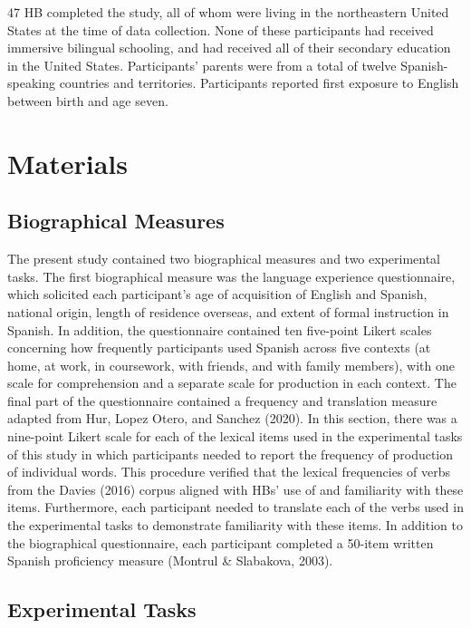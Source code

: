 \documentclass[
  english,
  man]{apa6}
\begin{document}
47 HB completed the study, all of whom were living in the northeastern United States at the time of data collection. None of these participants had received immersive bilingual schooling, and had received all of their secondary education in the United States. Participants' parents were from a total of twelve Spanish-speaking countries and territories. Participants reported first exposure to English between birth and age seven.

\hypertarget{materials}{%
\section{Materials}\label{materials}}

\hypertarget{biographical-measures}{%
\subsection{Biographical Measures}\label{biographical-measures}}

The present study contained two biographical measures and two experimental tasks. The first biographical measure was the language experience questionnaire, which solicited each participant's age of acquisition of English and Spanish, national origin, length of residence overseas, and extent of formal instruction in Spanish. In addition, the questionnaire contained ten five-point Likert scales concerning how frequently participants used Spanish across five contexts (at home, at work, in coursework, with friends, and with family members), with one scale for comprehension and a separate scale for production in each context. The final part of the questionnaire contained a frequency and translation measure adapted from Hur, Lopez Otero, and Sanchez (2020). In this section, there was a nine-point Likert scale for each of the lexical items used in the experimental tasks of this study in which participants needed to report the frequency of production of individual words. This procedure verified that the lexical frequencies of verbs from the Davies (2016) corpus aligned with HBs' use of and familiarity with these items. Furthermore, each participant needed to translate each of the verbs used in the experimental tasks to demonstrate familiarity with these items. In addition to the biographical questionnaire, each participant completed a 50-item written Spanish proficiency measure (Montrul \& Slabakova, 2003).

\hypertarget{experimental-tasks}{%
\subsection{Experimental Tasks}\label{experimental-tasks}}
\end{document}
